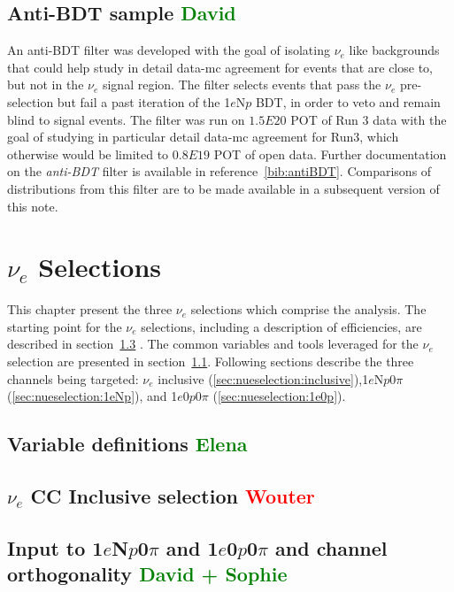 \documentclass[a4paper]{article}
\newcommand{\npsel}{1$e$N$p$0$\pi$ }
\newcommand{\zpsel}{1$e$0$p$0$\pi$ }
\begin{document}
\subsection{Anti-BDT sample \textcolor{green}{David}}
\par An anti-BDT filter was developed with the goal of isolating $\nu_e$ like backgrounds that could help study in detail data-mc agreement for events that are close to, but not in the $\nu_e$ signal region. The filter selects events that pass the $\nu_e$  pre-selection but fail a past iteration of the 1$e$N$p$ BDT, in order to veto and remain blind to signal events. The filter was run on $1.5E20$ POT of Run 3 data with the goal of studying in particular detail data-mc agreement for Run3, which otherwise would be limited to $0.8E19$ POT of open data. Further documentation on the \emph{anti-BDT} filter is available in reference~\ref{bib:antiBDT}. Comparisons of distributions from this filter are to be made available in a subsequent version of this note.

\newpage

\section{$\nu_e$ Selections}
\par This chapter present the three $\nu_e$ selections which comprise the analysis. The starting point for the $\nu_e$ selections, including a description of efficiencies, are described in section~\ref{sec:nueselection:inputs} . The common variables and tools leveraged for the $\nu_e$ selection are presented in section~\ref{sec:nueselection:variables}. Following sections describe the three channels being targeted: $\nu_e$ inclusive (\ref{sec:nueselection:inclusive}),1$e$N$p$0$\pi$ (\ref{sec:nueselection:1eNp}), and 1$e$0$p$0$\pi$ (\ref{sec:nueselection:1e0p}).

\subsection{Variable definitions \textcolor{green}{Elena}}
\label{sec:nueselection:variables}
\clearpage
\subsection{$\nu_e$ CC Inclusive selection \textcolor{red}{Wouter}}

\clearpage


\subsection{Input to \npsel and \zpsel and channel orthogonality \textcolor{green}{David + Sophie} }
\label{sec:nueselection:inputs}
\end{document}

